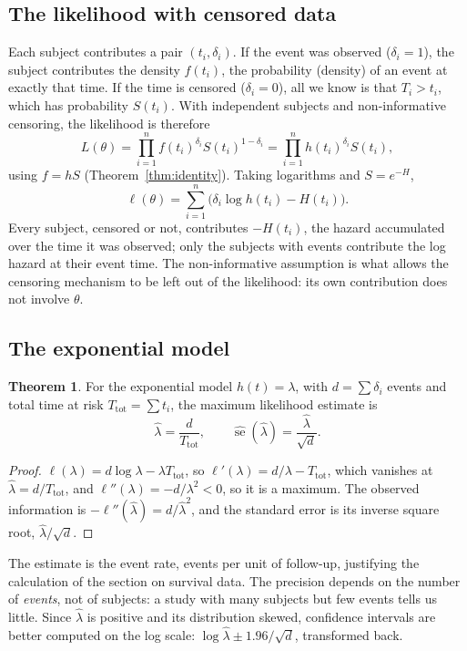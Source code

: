 \documentclass[11pt,a4paper]{article}
\numberwithin{equation}{section}
\theoremstyle{definition}
\newtheorem{thm}{Theorem}[subsection]
\begin{document}
\subsection{The likelihood with censored data}
\label{ssec:likelihood}

Each subject contributes a pair $(t_i, \delta_i)$. If the event was observed ($\delta_i = 1$), the subject contributes the density $f(t_i)$, the probability (density) of an event at exactly that time. If the time is censored ($\delta_i = 0$), all we know is that $T_i > t_i$, which has probability $S(t_i)$. With independent subjects and non-informative
censoring, the likelihood is therefore
\[
L(\theta) = \prod_{i = 1}^nf(t_i)^{\delta_i}S(t_i)^{1 - \delta_i} = \prod_{i = 1}^nh(t_i)^{\delta_i}S(t_i) ,
\]
using $f = hS$ (Theorem~\ref{thm:identity}). Taking logarithms and $S = e^{-H}$,
\[
\ell(\theta) = \sum_{i = 1}^n\bigl(\delta_i\log h(t_i) - H(t_i)\bigr) .
\]
Every subject, censored or not, contributes $-H(t_i)$, the hazard accumulated over the time it was observed; only the subjects with events contribute the log hazard at their event time. The non-informative assumption is what allows the censoring mechanism to be left out of the likelihood: its own contribution does not involve $\theta$.

\subsection{The exponential model}
\label{ssec:expmodel}

\begin{thm}
\label{thm:expmle}
For the exponential model $h(t) = \lambda$, with $d = \sum\delta_i$ events and total time at risk $T_{\mathrm{tot}} = \sum t_i$, the maximum likelihood estimate is
\[
\hat\lambda = \frac d{T_{\mathrm{tot}}}, \qquad \widehat{\operatorname{se}}(\hat\lambda) = \frac{\hat\lambda}{\sqrt d} .
\]
\end{thm}

\begin{proof}
$\ell(\lambda) = d\log\lambda - \lambda T_{\mathrm{tot}}$, so $\ell'(\lambda) = d/\lambda - T_{\mathrm{tot}}$, which vanishes at $\hat\lambda = d/T_{\mathrm{tot}}$, and $\ell''(\lambda) = -d/\lambda^2 < 0$, so it is a maximum. The observed information is $-\ell''(\hat\lambda) = d/\hat\lambda^2$, and the standard error is its inverse square
root, $\hat\lambda/\sqrt d$.
\end{proof}

The estimate is the event rate, events per unit of follow-up, justifying the calculation of the section on survival data. The precision depends on the number of \emph{events}, not of subjects: a study with many subjects but few events tells us little. Since $\hat\lambda$ is positive and its distribution skewed, confidence intervals are better computed on the log scale:
$\log\hat\lambda \pm 1.96/\sqrt d$, transformed back.
\end{document}
